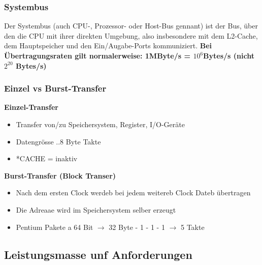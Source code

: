 \subsubsection{Systembus}
Der Systembus (auch CPU-, Prozessor- oder Host-Bus gennant) ist der Bus, über den die CPU mit ihrer direkten Umgebung, also insbesondere mit dem L2-Cache, dem Hauptspeicher und den Ein/Augabe-Ports kommuniziert.\newline
\textbf{Bei Übertragungsraten gilt normalerweise: 1MByte/s = $ 10^6 $Bytes/s (nicht $ 2^{20}$ Bytes/s)}\newline

\subsubsection{Einzel vs Burst-Transfer}
\begin{multicols}{2}
    \begin{minipage}{\linewidth}
        \textbf{Einzel-Transfer}
        \begin{itemize}
            \item Transfer von/zu Speichersystem, Register, I/O-Geräte
            \item Datengrösse
            ..8 Byte
             Takte
            \item  *CACHE = inaktiv
        \end{itemize}
    \end{minipage}

    \begin{minipage}{\linewidth}
    \textbf{Burst-Transfer (Block Transer)}
    \begin{itemize}
        \item Nach dem ersten Clock werdeb bei jedem weitereb Clock Dateb übertragen
        \item Die Adreaae wird im Speichersystem selber erzeugt
        \item Pentium
         Pakete a 64 Bit $ \rightarrow $ 32 Byte
         - 1 - 1 - 1 $ \rightarrow $ 5 Takte
    \end{itemize}
    \end{minipage}
\end{multicols}

\subsection{Leistungsmasse unf Anforderungen}
